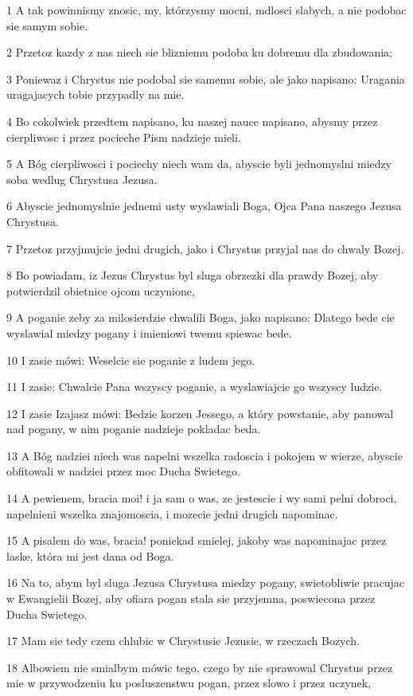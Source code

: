 \par 1 A tak powinnismy znosic, my, którzysmy mocni, mdlosci slabych, a nie podobac sie samym sobie.
\par 2 Przetoz kazdy z nas niech sie blizniemu podoba ku dobremu dla zbudowania;
\par 3 Poniewaz i Chrystus nie podobal sie samemu sobie, ale jako napisano: Uragania uragajacych tobie przypadly na mie.
\par 4 Bo cokolwiek przedtem napisano, ku naszej nauce napisano, abysmy przez cierpliwosc i przez pocieche Pism nadzieje mieli.
\par 5 A Bóg cierpliwosci i pociechy niech wam da, abyscie byli jednomyslni miedzy soba wedlug Chrystusa Jezusa.
\par 6 Abyscie jednomyslnie jednemi usty wyslawiali Boga, Ojca Pana naszego Jezusa Chrystusa.
\par 7 Przetoz przyjmujcie jedni drugich, jako i Chrystus przyjal nas do chwaly Bozej.
\par 8 Bo powiadam, iz Jezus Chrystus byl sluga obrzezki dla prawdy Bozej, aby potwierdzil obietnice ojcom uczynione,
\par 9 A poganie zeby za milosierdzie chwalili Boga, jako napisano: Dlatego bede cie wyslawial miedzy pogany i imieniowi twemu spiewac bede.
\par 10 I zasie mówi: Weselcie sie poganie z ludem jego.
\par 11 I zasie: Chwalcie Pana wszyscy poganie, a wyslawiajcie go wszyscy ludzie.
\par 12 I zasie Izajasz mówi: Bedzie korzen Jessego, a który powstanie, aby panowal nad pogany, w nim poganie nadzieje pokladac beda.
\par 13 A Bóg nadziei niech was napelni wszelka radoscia i pokojem w wierze, abyscie obfitowali w nadziei przez moc Ducha Swietego.
\par 14 A pewienem, bracia moi! i ja sam o was, ze jestescie i wy sami pelni dobroci, napelnieni wszelka znajomoscia, i mozecie jedni drugich napominac.
\par 15 A pisalem do was, bracia! poniekad smielej, jakoby was napominajac przez laske, która mi jest dana od Boga.
\par 16 Na to, abym byl sluga Jezusa Chrystusa miedzy pogany, swietobliwie pracujac w Ewangielii Bozej, aby ofiara pogan stala sie przyjemna, poswiecona przez Ducha Swietego.
\par 17 Mam sie tedy czem chlubic w Chrystusie Jezusie, w rzeczach Bozych.
\par 18 Albowiem nie smialbym mówic tego, czego by nie sprawowal Chrystus przez mie w przywodzeniu ku posluszenstwu pogan, przez slowo i przez uczynek,
